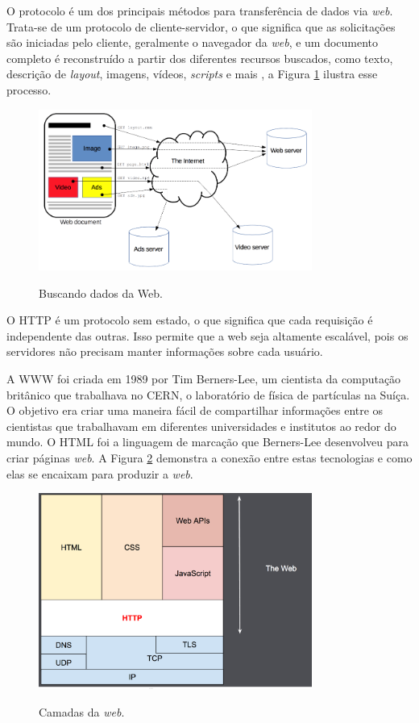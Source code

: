 O protocolo  é um dos principais métodos para transferência de dados via \textit{web}. Trata-se de um protocolo de cliente-servidor, o que significa que as solicitações são iniciadas pelo cliente, geralmente o navegador da \textit{web}, e um documento completo é reconstruído a partir dos diferentes recursos buscados, como texto, descrição de \textit{layout}, imagens, vídeos, \textit{scripts} e mais \cite{mdn_http_overview}, a Figura \ref{fig:http-get} ilustra esse processo.

\begin{figure}[h]
\centering
\caption{Buscando dados da Web.}
\includegraphics[width=0.8\textwidth]{figuras/fetching_a_page.png}
\label{fig:http-get}
\end{figure}

O \gls{HTTP} é um protocolo sem estado, o que significa que cada requisição é independente das outras. Isso permite que a web seja altamente escalável, pois os servidores não precisam manter informações sobre cada usuário.

A \gls{WWW} foi criada em 1989 por Tim Berners-Lee, um cientista da computação britânico que trabalhava no CERN, o laboratório de física de partículas na Suíça. O objetivo era criar uma maneira fácil de compartilhar informações entre os cientistas que trabalhavam em diferentes universidades e institutos ao redor do mundo. O \gls{HTML} foi a linguagem de marcação que Berners-Lee desenvolveu para criar páginas \textit{web}. A Figura \ref{fig:http-html} demonstra a conexão entre estas tecnologias e como elas se encaixam para produzir a \textit{web}.

\begin{figure}[h]
\centering
\caption{Camadas da \textit{web}.}
\includegraphics[width=0.8\textwidth]{figuras/http-layers.png}
\label{fig:http-html}
\end{figure}

